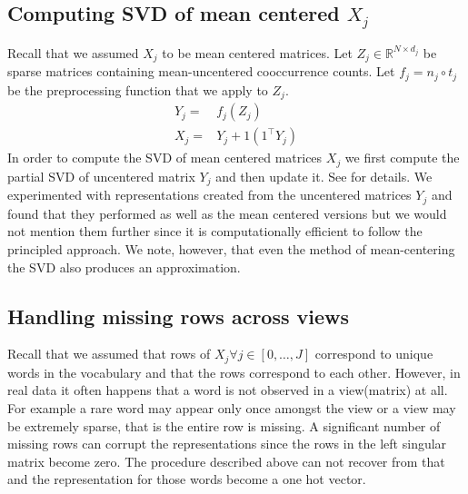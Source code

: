 \documentclass[11pt]{article}
\begin{document}
\subsection{Computing SVD of mean centered $X_j$}
\label{ssec:svdmc}
Recall that we assumed $X_j$ to be mean centered matrices. Let $Z_j
\in \mathbb{R}^{N \times d_j}$ be sparse matrices containing
mean-uncentered cooccurrence counts. Let $f_j = n_j \circ t_j $ be the preprocessing
function that we apply to $Z_j$. 
\begin{align}
  Y_j =& f_j (Z_j) \\
  X_j =& Y_j + 1 (1^\top Y_j)
\end{align}
In order to compute the SVD of mean centered matrices $X_j$ we first
compute the partial SVD of uncentered 
matrix $Y_j$ and then update it. See \cite{brand2006fast} for details.
We experimented with representations created from the
uncentered matrices $Y_j$ and found that they performed as well as 
the mean centered versions but we would not mention them further since
it is computationally efficient to follow the principled approach. We
note, however, that even the method of mean-centering the SVD also
produces an approximation.

\subsection{Handling missing rows across views}
\label{ssec:missing}
Recall that we assumed that rows of $X_j \forall j \in [0,\ldots , J]$ correspond to unique
words in the vocabulary and that the rows correspond to each
other. However, in real data it often happens that a word is not observed in a view(matrix) at
all. For example a rare word may appear only once amongst the view or
a view may be extremely sparse,
that is the entire row is missing. A significant number of 
missing rows can corrupt the representations since the rows
in the left singular matrix become zero. The procedure described above
can not recover from that and the representation for those words become a
one hot vector.
\end{document}
